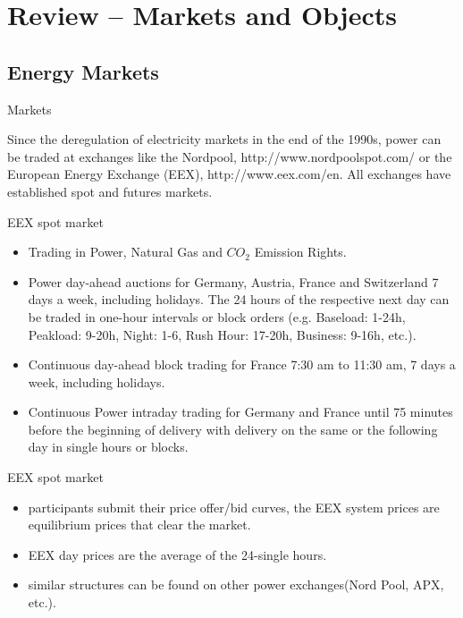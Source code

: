 \section{Review -- Markets and Objects}
\subsection{Energy Markets}




{Markets}

Since the deregulation of electricity markets in the end of the
1990s, power can be traded at exchanges like the Nordpool, http://www.nordpoolspot.com/  or the
European Energy Exchange (EEX), http://www.eex.com/en. All exchanges have established
spot and futures markets.







{EEX spot market}
\begin{itemize}
\item<1->Trading in Power, Natural Gas and $CO_2$ Emission Rights.
\item<2->Power day-ahead auctions for Germany, Austria, France and Switzerland 7 days a week, including holidays. The 24 hours of the respective next day can be traded in one-hour intervals or block orders (e.g. Baseload: 1-24h, Peakload: 9-20h, Night: 1-6, Rush Hour: 17-20h, Business: 9-16h, etc.).
\item<3-> Continuous day-ahead block trading for France 7:30 am to 11:30 am, 7 days a week, including holidays.
\item<4->Continuous Power intraday trading for Germany and France until 75 minutes before the beginning of delivery with delivery on the same or the following day in single hours or blocks.
\end{itemize}



{EEX spot market}
\begin{itemize}
\item<1-> participants submit their price offer/bid curves, the EEX system prices are equilibrium prices that clear the market.
\item<2-> EEX day prices are the average of the 24-single hours.
\item<3-> similar structures can be found on other power exchanges(Nord Pool, APX, etc.).
\end{itemize}



